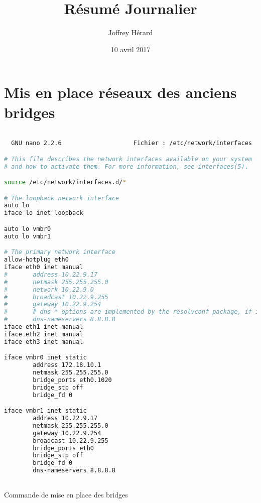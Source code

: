 \documentclass[french]{article}
\begin{document}
\title{Résumé Journalier}
\author{Joffrey Hérard}
\date{10 avril 2017} 

\maketitle
\section{Mis en place réseaux des anciens bridges}


\begin{lstlisting}[language=bash,caption={}]

  GNU nano 2.2.6                    Fichier : /etc/network/interfaces                                              

# This file describes the network interfaces available on your system
# and how to activate them. For more information, see interfaces(5).

source /etc/network/interfaces.d/*

# The loopback network interface
auto lo
iface lo inet loopback

auto lo vmbr0
auto lo vmbr1

# The primary network interface
allow-hotplug eth0
iface eth0 inet manual
#       address 10.22.9.17
#       netmask 255.255.255.0
#       network 10.22.9.0
#       broadcast 10.22.9.255
#       gateway 10.22.9.254
#       # dns-* options are implemented by the resolvconf package, if installed
#       dns-nameservers 8.8.8.8
iface eth1 inet manual
iface eth2 inet manual
iface eth3 inet manual

iface vmbr0 inet static
        address 172.18.10.1
        netmask 255.255.255.0
        bridge_ports eth0.1020
        bridge_stp off
        bridge_fd 0

iface vmbr1 inet static
        address 10.22.9.17
        netmask 255.255.255.0
        gateway 10.22.9.254
        broadcast 10.22.9.255
        bridge_ports eth0
        bridge_stp off
        bridge_fd 0
        dns-nameservers 8.8.8.8



\end{lstlisting}
Commande de mise en place des bridges
\end{document}
